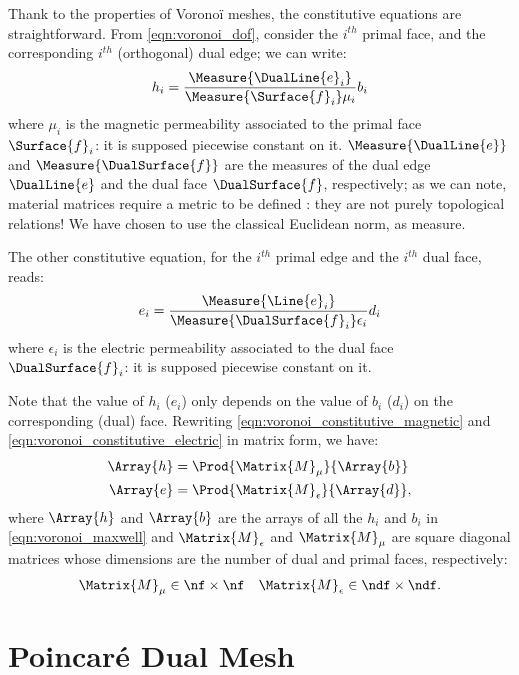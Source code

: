 Thank to the properties of Vorono\"i meshes, the constitutive
equations are straightforward. From \eqref{eqn:voronoi_dof}, consider
the $i^{th}$ primal face, and the corresponding $i^{th}$ (orthogonal) dual edge; we
can write:
\begin{equation} \label{eqn:voronoi_constitutive_magnetic}
  h_i = \frac{\Measure{\DualLine{e}_i}}{\Measure{\Surface{f}_i} \mu_i} b_i
\end{equation}
where $\mu_i$ is the magnetic permeability associated to the primal
face $\Surface{f}_i$: it is supposed piecewise constant on
it. $\Measure{\DualLine{e}}$ and $\Measure{\DualSurface{f}}$ are the
measures of the dual edge $\DualLine{e}$ and the dual face
$\DualSurface{f}$, respectively; as we can note, material matrices
require a metric to be defined \cite{bossavit_computational}: they are
not purely topological relations! We have chosen to use the classical
Euclidean norm, as measure.

The other constitutive equation, for the $i^{th}$ primal edge and the
$i^{th}$ dual face, reads:
\begin{equation} \label{eqn:voronoi_constitutive_electric}
  e_i = \frac{\Measure{\Line{e}_i}}{\Measure{\DualSurface{f}_i} \epsilon_i} d_i
\end{equation}
where $\epsilon_i$ is the electric permeability associated to the dual
face $\DualSurface{f}_i$: it is supposed piecewise constant on it.

Note that the value of $h_i$ ($e_i$) only depends on the value of
$b_i$ ($d_i$) on the corresponding (dual) face. Rewriting
\eqref{eqn:voronoi_constitutive_magnetic} and
\eqref{eqn:voronoi_constitutive_electric} in matrix form, we have:
\begin{align*}
  \Array{h} & = \Prod{\Matrix{M}_\mu}{\Array{b}} \\
  \Array{e} & = \Prod{\Matrix{M}_\epsilon}{\Array{d}} ,
\end{align*}
where $\Array{h}$ and $\Array{b}$ are the arrays of all the $h_i$ and
$b_i$ in \eqref{eqn:voronoi_maxwell} and $\Matrix{M}_\epsilon$ and
$\Matrix{M}_\mu$ are square diagonal matrices whose dimensions are the number
of dual and primal faces, respectively:
\begin{align*}
  \Matrix{M}_\mu \in \nf \times \nf && \Matrix{M}_\epsilon \in \ndf \times \ndf .
\end{align*}

\section{Poincar\'e Dual Mesh} \label{sec:poicare}


